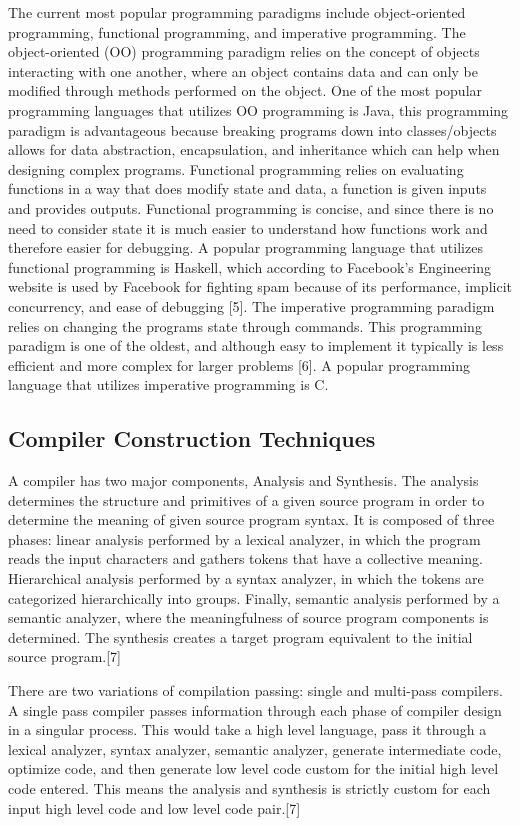 \documentclass[11pt]{article}
\begin{document}
The current most popular programming paradigms include object-oriented programming, functional programming, and imperative programming. The object-oriented (OO) programming paradigm relies on the concept of objects interacting with one another, where an object contains data and can only be modified through methods performed on the object. One of the most popular programming languages that utilizes OO programming is Java, this programming paradigm is advantageous because breaking programs down into classes/objects allows for data abstraction, encapsulation, and inheritance which can help when designing complex programs. Functional programming relies on evaluating functions in a way that does modify state and data, a function is given inputs and provides outputs. Functional programming is concise, and since there is no need to consider state it is much easier to understand how functions work and therefore easier for debugging. A popular programming language that utilizes functional programming is Haskell, which according to Facebook’s Engineering website is used by Facebook for fighting spam because of its performance, implicit concurrency, and ease of debugging [5]. The imperative programming paradigm relies on changing the programs state through commands. This programming paradigm is one of the oldest, and although easy to implement it typically is less efficient and more complex for larger problems [6]. A popular programming language that utilizes imperative programming is C.


\subsection{Compiler Construction Techniques}

A compiler has two major components, Analysis and Synthesis. The analysis determines the structure and primitives of a given source program in order to determine the meaning of given source program syntax. It is composed of three phases: linear analysis performed by a lexical analyzer, in which the program reads the input characters and gathers tokens that have a collective meaning. Hierarchical analysis performed by a syntax analyzer, in which the tokens are categorized hierarchically into groups. Finally, semantic analysis performed by a semantic analyzer, where the meaningfulness of source program  components is determined. The synthesis creates a target program equivalent to the initial source program.[7] 

There are two variations of compilation passing: single and multi-pass compilers. A single pass compiler passes information through each phase of compiler design in a singular process. This would take a high level language, pass it through a lexical analyzer, syntax analyzer, semantic analyzer, generate intermediate code, optimize code, and then generate low level code custom for the initial high level code entered. This means the analysis and synthesis is strictly custom for each input high level code and low level code pair.[7] 
\end{document}
